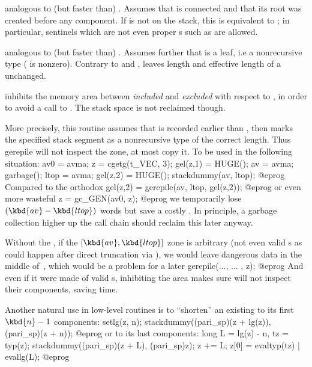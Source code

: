  analogous to (but faster than)
. Assumes that  is connected and that its root was
created before any component. If  is not on the stack, this is
equivalent to ; in particular, sentinels which are not even
proper s such as  are allowed.

 analogous to (but faster than)
. Assumes further that  is a leaf, i.e a
nonrecursive type ( is nonzero). Contrary to
 and ,  leaves
length and effective length of a  unchanged.


 inhibits the memory area
between  \emph{included} and  \emph{excluded} with respect to
, in order to avoid a call to .
The stack space is not reclaimed though.

More precisely, this routine assumes that  is recorded earlier
than , then marks the specified stack segment as a
nonrecursive type of the correct length. Thus gerepile will not inspect
the zone, at most copy it. To be used in the following situation:
\bprog
  av0 = avma; z = cgetg(t_VEC, 3);
  gel(z,1) = HUGE(); av = avma; garbage(); ltop = avma;
  gel(z,2) = HUGE(); stackdummy(av, ltop);
@eprog\noindent
Compared to the orthodox
\bprog
  gel(z,2) = gerepile(av, ltop, gel(z,2));
@eprog\noindent
or even more wasteful
\bprog
  z = gc_GEN(av0, z);
@eprog\noindent
we temporarily lose $(\kbd{av} - \kbd{ltop})$ words but save a costly
. In principle, a garbage collection higher up the call
chain should reclaim this later anyway.

Without the , if the $[\kbd{av}, \kbd{ltop}]$ zone is
arbitrary (not even valid s as could happen after direct
truncation via ), we would leave dangerous data in the middle
of~, which would be a problem for a later
\bprog
  gerepile(..., ... , z);
@eprog\noindent
And even if it were made of valid s, inhibiting the area makes sure
 will not inspect their components, saving time.

Another natural use in low-level routines is to ``shorten'' an existing
  to its first $\kbd{n}-1$ components:
\bprog
  setlg(z, n);
  stackdummy((pari_sp)(z + lg(z)), (pari_sp)(z + n));
@eprog\noindent
or to its last  components:
\bprog
  long L = lg(z) - n, tz = typ(z);
  stackdummy((pari_sp)(z + L), (pari_sp)z);
  z += L; z[0] = evaltyp(tz) | evallg(L);
@eprog

